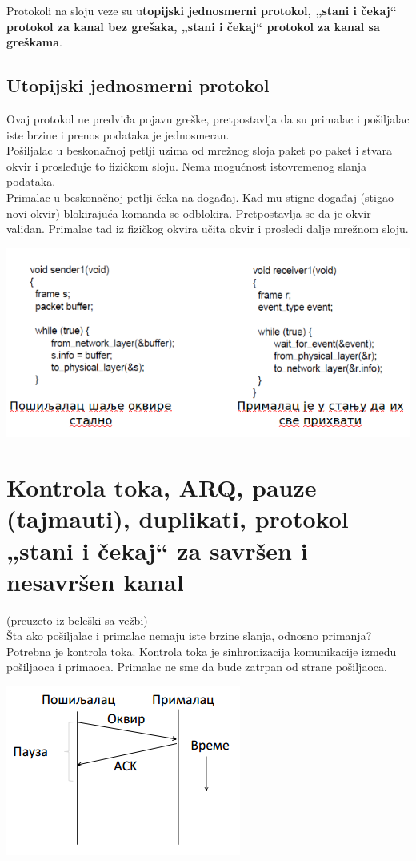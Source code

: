 \documentclass{article} %
\begin{document}
Protokoli na sloju veze su u\textbf{topijski jednosmerni protokol, „stani i čekaj“ protokol za kanal bez grešaka, „stani i čekaj“ protokol za kanal sa greškama}.
\subsection{Utopijski jednosmerni protokol}
Ovaj protokol ne predviđa pojavu greške, pretpostavlja da su primalac i pošiljalac iste brzine i prenos podataka je jednosmeran.\\

Pošiljalac u beskonačnoj petlji uzima od mrežnog sloja paket po paket i stvara okvir i prosleđuje to fizičkom sloju. Nema mogućnost istovremenog slanja podataka.\\
Primalac u beskonačnoj petlji čeka na događaj. Kad mu stigne događaj (stigao novi okvir) blokirajuća komanda se odblokira. Pretpostavlja se da je okvir validan. Primalac tad iz fizičkog okvira učita okvir i prosledi dalje mrežnom sloju. 
\begin{center}
	\includegraphics[scale=0.5]{utopijski}
\end{center}
\section{Kontrola toka, ARQ, pauze (tajmauti), duplikati, protokol „stani i čekaj“ za savršen i nesavršen kanal}
(preuzeto iz beleški sa vežbi)\\

Šta ako pošiljalac i primalac nemaju iste brzine slanja, odnosno primanja? Potrebna je kontrola toka.
Kontrola toka je sinhronizacija komunikacije između pošiljaoca i primaoca. Primalac ne sme da bude zatrpan od strane pošiljaoca.\\
\begin{center}
	\includegraphics[scale=0.5]{razlBrzine}
\end{center}
\end{document}
